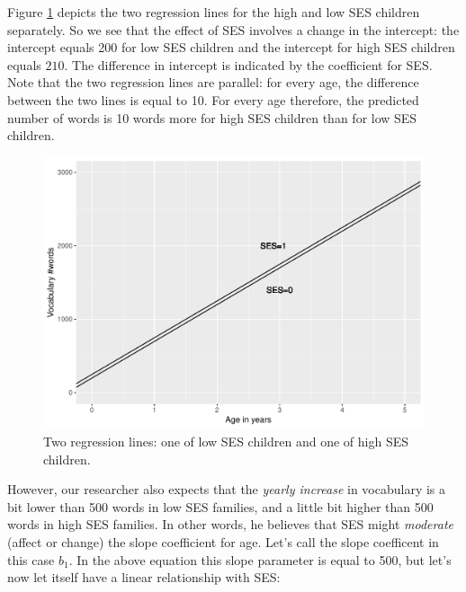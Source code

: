 \documentclass[]{report}\usepackage[]{graphicx}\usepackage[]{color}
\makeatletter
\def\maxwidth{ %
  \ifdim\Gin@nat@width>\linewidth
    \linewidth
  \else
    \Gin@nat@width
  \fi
}
\newenvironment{knitrout}{}{} %
\makeatother
\begin{document}
Figure \ref{fig:summary_plot0} depicts the two regression lines for the high and low SES children separately. So we see that the effect of SES involves a change in the intercept: the intercept equals 200 for low SES children and the intercept for high SES children equals $210$. The difference in intercept is indicated by the coefficient for SES. Note that the two regression lines are parallel: for every age, the difference between the two lines is equal to 10. For every age therefore, the predicted number of words is 10 words more for high SES children than for low SES children.


\begin{knitrout}
\color{fgcolor}\begin{figure}
\includegraphics[width=\maxwidth]{figure/summary_plot0-1} \caption[Two regression lines]{Two regression lines: one of low SES children and one of high SES children.}\label{fig:summary_plot0}
\end{figure}


\end{knitrout}

However, our researcher also expects that the \textit{yearly increase} in vocabulary is a bit lower than 500 words in low SES families, and a little bit higher than 500 words in high SES families. In other words, he believes that SES might \textit{moderate} (affect or change) the slope coefficient for age. Let's call the slope coefficent in this case $b_1$. In the above equation this slope parameter is equal to 500, but let's now let itself have a linear relationship with SES:
\end{document}
